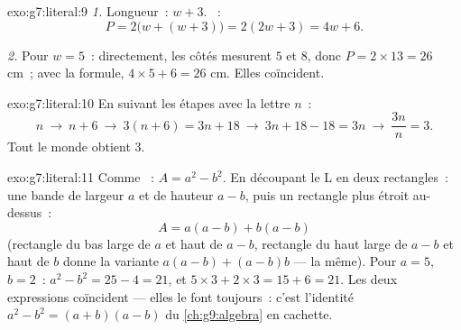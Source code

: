 \begin{solution}{exo:g7:literal:9}
\emph{1.} Longueur~: $w + 3$. ~:
\[
P = 2\bigl(w + (w + 3)\bigr) = 2(2w + 3) = 4w + 6 .
\]

\emph{2.} Pour $w = 5$~: directement, les côtés mesurent $5$ et $8$,
donc $P = 2 \times 13 = 26$ cm~; avec la formule,
$4 \times 5 + 6 = 26$ cm. Elles coïncident.
\end{solution}

\begin{solution}{exo:g7:literal:10}
En suivant les étapes avec la lettre $n$~:
\[
n \ \to\ n + 6 \ \to\ 3(n + 6) = 3n + 18 \ \to\ 3n + 18 - 18 = 3n
\ \to\ \frac{3n}{n} = 3 .
\]
Tout le monde obtient $3$.
\end{solution}

\begin{solution}{exo:g7:literal:11}
Comme ~: $A = a^2 - b^2$. En découpant le L en deux
rectangles~: une bande de largeur $a$ et de hauteur $a - b$, puis un
rectangle plus étroit au-dessus~:
\[
A = a(a - b) + b(a - b)
\]
(rectangle du bas large de $a$ et haut de $a - b$, rectangle du haut
large de $a - b$ et haut de $b$ donne la variante
$a(a-b) + (a-b)b$ --- la même). Pour $a = 5$, $b = 2$~:
$a^2 - b^2 = 25 - 4 = 21$, et $5 \times 3 + 2 \times 3 = 15 + 6 = 21$.
Les deux expressions coïncident --- elles le font toujours~: c'est
l'identité $a^2 - b^2 = (a + b)(a - b)$ du \cref{ch:g9:algebra} en
cachette.
\end{solution}

